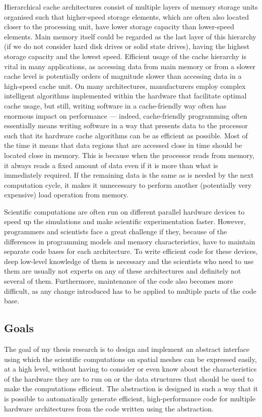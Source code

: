 \documentclass[fontsize=11pt, appendixprefix=true]{scrreprt}
\begin{document}
Hierarchical cache architectures consist of multiple layers of memory storage
units organised such that higher-speed storage elements, which are often also
located closer to the processing unit, have lower storage capacity than
lower-speed elements. Main memory itself could be regarded as the last layer of
this hierarchy (if we do not consider hard disk drives or solid state drives),
having the highest storage capacity and the lowest speed. Efficient usage of the
cache hierarchy is vital in many applications, as accessing data from main
memory or from a slower cache level is potentially orders of magnitude slower
than accessing data in a high-speed cache unit. On many architectures,
manufacturers employ complex intelligent algorithms implemented within the
hardware that facilitate optimal cache usage, but still, writing software in a
cache-friendly way often has enormous impact on performance --- indeed,
cache-friendly programming often essentially means writing software in a way
that presents data to the processor such that its hardware cache algorithms can
be as efficient as possible. Most of the time it means that data regions that
are accessed close in time should be located close in memory. This is because
when the processor reads from memory, it always reads a fixed amount of data
even if it is more than what is immediately required. If the remaining data is
the same as is needed by the next computation cycle, it makes it unnecessary to
perform another (potentially very expensive) load operation from memory.

Scientific computations are often run on different parallel hardware devices to
speed up the simulations and make scientific experimentation faster. However,
programmers and scientists face a great challenge if they, because of the
differences in programming models and memory characteristics, have to maintain
separate code bases for each architecture. To write efficient code for these
devices, deep low-level knowledge of them is necessary and the scientists who
need to use them are usually not experts on any of these architectures and
definitely not several of them. Furthermore, maintenance of the code also
becomes more difficult, as any change introduced has to be applied to multiple
parts of the code base.

\subsection{Goals}

The goal of my thesis research is to design and implement an abstract interface
using which the scientific computations on spatial meshes can be expressed
easily, at a high level, without having to consider or even know about the
characteristics of the hardware they are to run on or the data structures that
should be used to make the computations efficient. The abstraction is designed
in such a way that it is possible to automatically generate efficient,
high-performance code for multiple hardware architectures from the code written
using the abstraction.
\end{document}

